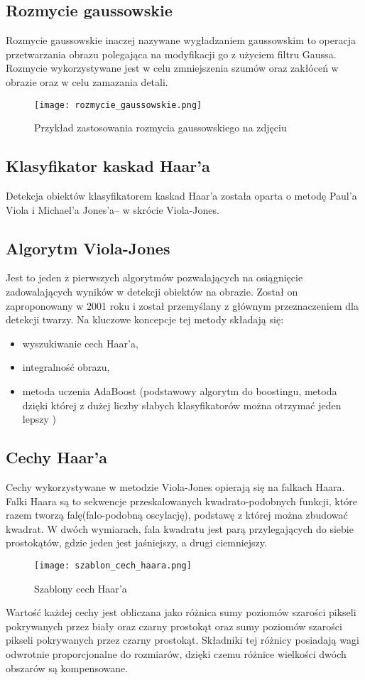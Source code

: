 \subsection{Rozmycie gaussowskie}
Rozmycie gaussowskie inaczej nazywane wygładzaniem gaussowskim to operacja przetwarzania obrazu polegająca na modyfikacji go z użyciem filtru Gaussa. Rozmycie wykorzystywane jest w celu zmniejszenia szumów oraz zakłóceń w obrazie oraz w celu zamazania detali.
\begin{figure}[H]
	\centering
	\texttt{[image: rozmycie\_gaussowskie.png]}
	\caption{Przykład zastosowania rozmycia gaussowskiego na zdjęciu}
	\label{fig:rozmycie_gaussowskie}
\end{figure}

\subsection{Klasyfikator kaskad Haar'a} \label{haar}
Detekcja obiektów klasyfikatorem kaskad Haar'a została oparta o metodę Paul'a Viola i Michael'a Jones'a– w skrócie Viola-Jones.

\subsection{Algorytm Viola-Jones}
Jest to jeden z pierwszych algorytmów pozwalających na osiągnięcie zadowalających wyników w detekcji obiektów na obrazie. Został on zaproponowany w 2001 roku i został przemyślany z głównym przeznaczeniem dla detekcji twarzy. Na kluczowe koncepcje tej metody składają się:
\begin{itemize}
\item wyszukiwanie cech Haar'a,
\item integralność obrazu,
\item metoda uczenia AdaBoost (podstawowy algorytm do boostingu, metoda dzięki której z dużej liczby słabych klasyfikatorów można otrzymać jeden lepszy )
\end{itemize}

\subsection{Cechy Haar'a}
Cechy wykorzystywane w metodzie Viola-Jones opierają się na falkach Haara. Falki Haara są to sekwencje przeskalowanych kwadrato-podobnych funkcji, które razem tworzą falę(falo-podobną oscylację), podstawę z której można zbudować kwadrat. W dwóch wymiarach, fala kwadratu jest parą przylegających do siebie prostokątów, gdzie jeden jest jaśniejszy, a drugi ciemniejszy.
\begin{figure}[H]
	\centering
	\texttt{[image: szablon\_cech\_haara.png]}
	\caption{Szablony cech Haar'a}
	\label{fig:szablon_cech_haara}
\end{figure}
Wartość każdej cechy jest obliczana jako różnica sumy poziomów szarości pikseli pokrywanych przez biały oraz czarny prostokąt oraz sumy poziomów szarości pikseli pokrywanych przez czarny prostokąt. Składniki tej różnicy posiadają wagi odwrotnie proporcjonalne do rozmiarów, dzięki czemu różnice wielkości dwóch obszarów są kompensowane.

